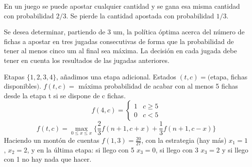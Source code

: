 \documentclass[twoside]{article}
\begin{document}
\newpage 
\begin{ejercicio}{4}
En un juego se puede apostar cualquier cantidad y se gana esa misma cantidad con probabilidad $2/3$. Se pierde la cantidad apostada con probabilidad $1/3$.

Se desea determinar, partiendo de 3 um, la política óptima acerca del número de fichas a apostar en tres jugadas consecutivas de forma que la probabilidad de tener al menos cinco um al final sea máxima. La decisión en cada jugada debe tener en cuenta los resultados de las jugadas anteriores.
\begin{solucion}
Etapas $\{1,2,3,4\}$, añadimos una etapa adicional. Estados $(t,c)=($etapa, fichas disponibles$)$. $f(t,c)=$ máxima probabilidad de acabar con al menos 5 fichas desde la etapa t si se dispone de c fichas. 
$$f(4,c)=\begin{cases}
1 & c\geq 5\\
0 & c<5
\end{cases}$$
$$f(t,c)=\max_{0\leq x\leq x}\{\frac{2}{3}f(n+1,c+x)+\frac{1}{3}f(n+1,c-x)\}$$
Haciendo un montón de cuentas
$f(1,3)=\frac{20}{27}$, con la estrategia (hay más) $x_1=1$, $x_2=2$, y en la última etapa: si llego con 5 $x_3=0$, si llego con 3 $x_3=2$ y si llego con 1 no hay nada que hacer.

\end{solucion}
\end{ejercicio}
\end{document}
